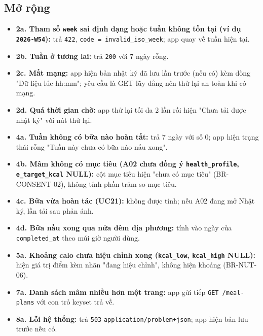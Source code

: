 \subsection{Mở rộng}
\begin{itemize}
\item \textbf{2a. Tham số {\small\texttt{week}} sai định dạng hoặc tuần không tồn tại (ví dụ {\small\texttt{2026-\allowbreak{}W54}}):} trả {\small\texttt{422}}, {\small\texttt{code = invalid\_\allowbreak{}\allowbreak{}iso\_\allowbreak{}\allowbreak{}week}}; app quay về tuần hiện tại.
\item \textbf{2b. Tuần ở tương lai:} trả {\small\texttt{200}} với 7 ngày rỗng.
\item \textbf{2c. Mất mạng:} app hiện bản nhật ký đã lưu lần trước (nếu có) kèm dòng "Dữ liệu lúc hh:mm"; yêu cầu là GET lũy đẳng nên thử lại an toàn khi có mạng.
\item \textbf{2d. Quá thời gian chờ:} app thử lại tối đa 2 lần rồi hiện "Chưa tải được nhật ký" với nút thử lại.
\item \textbf{4a. Tuần không có bữa nào hoàn tất:} trả 7 ngày với số 0; app hiện trạng thái rỗng "Tuần này chưa có bữa nào nấu xong".
\item \textbf{4b. Mâm không có mục tiêu (A02 chưa đồng ý {\small\texttt{health\_\allowbreak{}\allowbreak{}profile}}, {\small\texttt{e\_\allowbreak{}\allowbreak{}target\_\allowbreak{}\allowbreak{}kcal}} NULL):} cột mục tiêu hiện "chưa có mục tiêu" (BR-\allowbreak{}CONSENT-\allowbreak{}02), không tính phần trăm so mục tiêu.
\item \textbf{4c. Bữa vừa hoàn tác (UC21):} không được tính; nếu A02 đang mở Nhật ký, lần tải sau phản ánh.
\item \textbf{4d. Bữa nấu xong qua nửa đêm địa phương:} tính vào ngày của {\small\texttt{completed\_\allowbreak{}\allowbreak{}at}} theo múi giờ người dùng.
\item \textbf{5a. Khoảng calo chưa hiệu chỉnh xong ({\small\texttt{kcal\_\allowbreak{}\allowbreak{}low}}, {\small\texttt{kcal\_\allowbreak{}\allowbreak{}high}} NULL):} hiện giá trị điểm kèm nhãn "đang hiệu chỉnh", không hiện khoảng (BR-\allowbreak{}NUT-\allowbreak{}06).
\item \textbf{7a. Danh sách mâm nhiều hơn một trang:} app gửi tiếp {\small\texttt{GET /\allowbreak{}\allowbreak{}meal-\allowbreak{}plans}} với con trỏ keyset trả về.
\item \textbf{8a. Lỗi hệ thống:} trả {\small\texttt{503}} {\small\texttt{application/\allowbreak{}\allowbreak{}problem+json}}; app hiện bản lưu trước nếu có.
\end{itemize}

